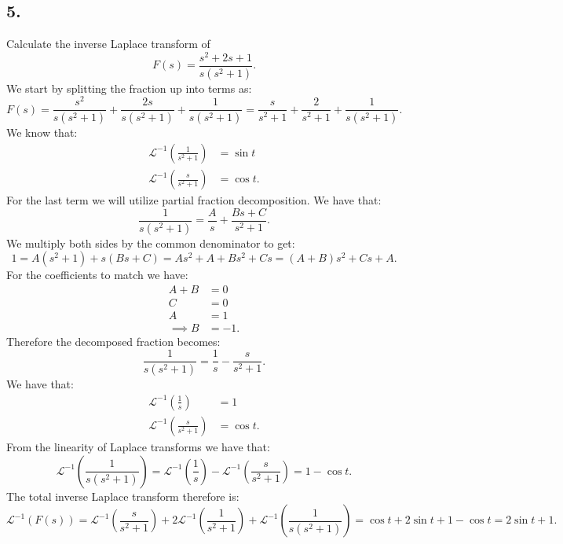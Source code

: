\subsection*{5.} Calculate the inverse Laplace transform of
\[ 
F(s) = \frac{s^2 + 2s + 1}{s \left( s^2 + 1 \right) }
.\]
\bigbreak
We start by splitting the fraction up into terms as:
\[ 
  F(s) = \frac{s^2}{s \left( s^2 + 1 \right) } + \frac{2s}{s \left( s^2 + 1 \right) } + \frac{1}{s \left( s^2 + 1 \right) } = \frac{s}{s^2 + 1} + \frac{2}{s^2 + 1} + \frac{1}{s\left( s^2 + 1 \right) }
.\]
We know that:
\begin{align*}
  \mathcal{L}^{-1}\left( \frac{1}{s^2 + 1} \right) &= \sin t \\
  \mathcal{L}^{-1}\left( \frac{s}{s^2 + 1} \right) &= \cos t
.\end{align*}
For the last term we will utilize partial fraction decomposition. We have that:
\[ 
\frac{1}{s \left( s^2 + 1 \right) } = \frac{A}{s} + \frac{B s  + C}{s^2 + 1}
.\]
We multiply both sides by the common denominator to get:
\[ 
1 = A \left( s^2 + 1 \right) + s \left( Bs + C \right) = As^2 + A + Bs^2 + Cs = \left( A+B \right) s^2 + Cs + A
.\]
For the coefficients to match we have:
\begin{align*}
  A + B &= 0 \\
  C &= 0 \\
  A &= 1 \\
  \implies B &= -1
.\end{align*}
Therefore the decomposed fraction becomes:
\[ 
\frac{1}{s \left( s^2 + 1 \right) } = \frac{1}{s} - \frac{s}{s^2 + 1}
.\]
We have that:
\begin{align*}
  \mathcal{L}^{-1} \left( \frac{1}{s} \right) &= 1 \\
  \mathcal{L}^{-1} \left( \frac{s}{s^2 + 1} \right) &= \cos t
.\end{align*}
From the linearity of Laplace transforms we have that:
\[ 
\mathcal{L}^{-1} \left( \frac{1}{s \left( s^2 + 1 \right) } \right) = \mathcal{L}^{-1} \left( \frac{1}{s} \right) - \mathcal{L}^{-1} \left( \frac{s}{s^2 + 1} \right) = 1 - \cos t
.\]
The total inverse Laplace transform therefore is:
\[ 
\mathcal{L}^{-1}\left( F(s) \right) = \mathcal{L}^{-1}\left( \frac{s}{s^2 + 1} \right) + 2\mathcal{L}^{-1} \left( \frac{1}{s^2 + 1} \right) + \mathcal{L}^{-1}\left( \frac{1}{s \left( s^2 + 1 \right) } \right) = \cos t + 2 \sin t + 1 - \cos t = 2 \sin t + 1
.\]



